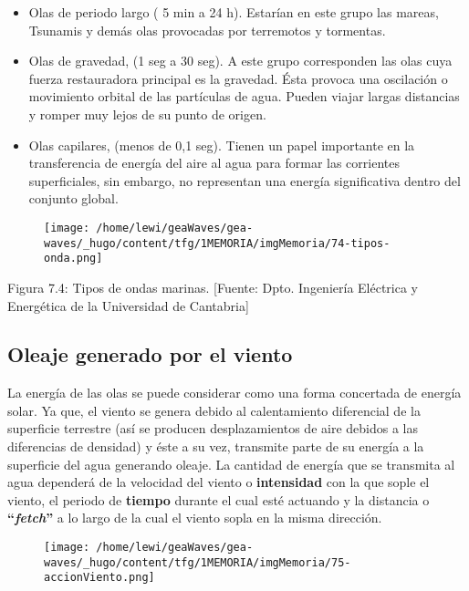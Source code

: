 \begin{itemize}
  \begin{itemize}
  \item
    Olas de periodo largo ( 5 min a 24 h). Estarían en este grupo las
    mareas, Tsunamis y demás olas provocadas por terremotos y tormentas.
  \item
    Olas de gravedad, (1 seg a 30 seg). A este grupo corresponden las
    olas cuya fuerza restauradora principal es la gravedad. Ésta provoca
    una oscilación o movimiento orbital de las partículas de agua.
    Pueden viajar largas distancias y romper muy lejos de su punto de
    origen.
  \item
    Olas capilares, (menos de 0,1 seg). Tienen un papel importante en la
    transferencia de energía del aire al agua para formar las corrientes
    superficiales, sin embargo, no representan una energía significativa
    dentro del conjunto global.
  \end{itemize}
\end{itemize}

\begin{figure}
\centering
\texttt{[image: /home/lewi/geaWaves/gea-waves/\_hugo/content/tfg/1MEMORIA/imgMemoria/74-tipos-onda.png]}
\caption{}
\end{figure}

Figura 7.4: Tipos de ondas marinas. {[}Fuente: Dpto. Ingeniería
Eléctrica y Energética de la Universidad de Cantabria{]}

\subsection{Oleaje generado por el viento}\label{header-n126}

La energía de las olas se puede considerar como una forma concertada de
energía solar. Ya que, el viento se genera debido al calentamiento
diferencial de la superficie terrestre (así se producen desplazamientos
de aire debidos a las diferencias de densidad) y éste a su vez,
transmite parte de su energía a la superficie del agua generando oleaje.
La cantidad de energía que se transmita al agua dependerá de la
velocidad del viento o \textbf{intensidad} con la que sople el viento,
el periodo de \textbf{tiempo} durante el cual esté actuando y la
distancia o \textbf{``\emph{fetch}''} a lo largo de la cual el viento
sopla en la misma dirección.

\begin{figure}
\centering
\texttt{[image: /home/lewi/geaWaves/gea-waves/\_hugo/content/tfg/1MEMORIA/imgMemoria/75-accionViento.png]}
\caption{}
\end{figure}

